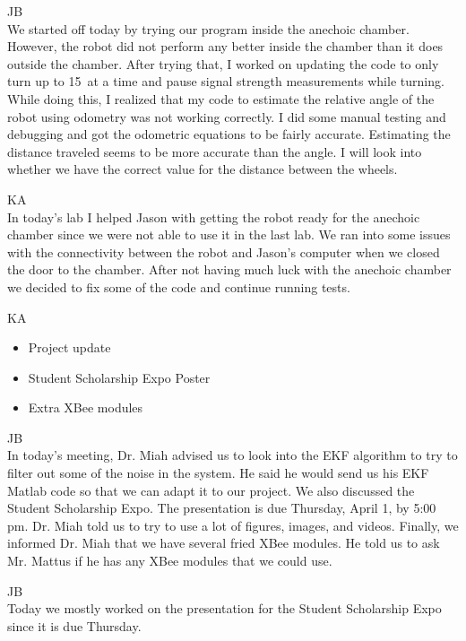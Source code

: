 \documentclass[fontsize=11pt, %
                             paper=letter, %
                             openany, %
                             captions=tableheading,
                             index=totoc,
                             hyperref]{labbook}
\begin{document}
\begin{addmargin}[0cm]{0cm}
JB\\
We started off today by trying our program inside the anechoic chamber. However, the robot did not perform any better inside the chamber than it does outside the chamber. After trying that, I worked on updating the code to only turn up to 15\textdegree~at a time and pause signal strength measurements while turning. While doing this, I realized that my code to estimate the relative angle of the robot using odometry was not working correctly. I did some manual testing and debugging and got the odometric equations to be fairly accurate. Estimating the distance traveled seems to be more accurate than the angle. I will look into whether we have the correct value for the distance between the wheels.

\vspace*{12pt}
KA\\
In today's lab I helped Jason with getting the robot ready for the anechoic chamber since we were not able to use it in the last lab. We ran into some issues with the connectivity between the robot and Jason's computer when we closed the door to the chamber. After not having much luck with the anechoic chamber we decided to fix some of the code and continue running tests.

KA\\
\begin{itemize}
    \item Project update
    \item Student Scholarship Expo Poster
    \item Extra XBee modules
\end{itemize}

JB\\
In today's meeting, Dr. Miah advised us to look into the EKF algorithm to try to filter out some of the noise in the system. He said he would send us his EKF Matlab code so that we can adapt it to our project. We also discussed the Student Scholarship Expo. The presentation is due Thursday, April 1, by 5:00 pm. Dr. Miah told us to try to use a lot of figures, images, and videos. Finally, we informed Dr. Miah that we have several fried XBee modules. He told us to ask Mr. Mattus if he has any XBee modules that we could use.

JB\\
Today we mostly worked on the presentation for the Student Scholarship Expo since it is due Thursday.


\end{addmargin}
\end{document}
